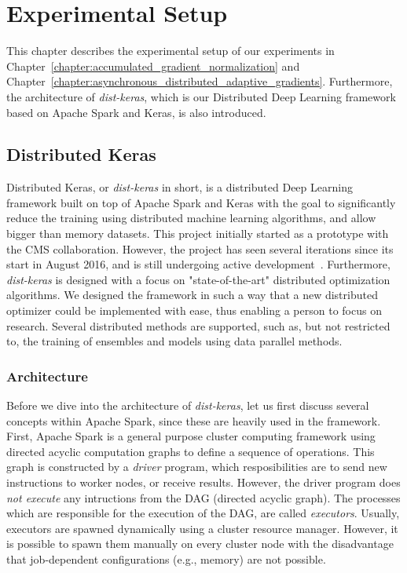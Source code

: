 %
%
%

\chapter{Experimental Setup}
\label{chapter:experiments}

This chapter describes the experimental setup of our experiments in Chapter~\ref{chapter:accumulated_gradient_normalization} and Chapter~\ref{chapter:asynchronous_distributed_adaptive_gradients}. Furthermore, the architecture of \emph{dist-keras}, which is our Distributed Deep Learning framework based on Apache Spark and Keras, is also introduced.

\section{Distributed Keras}
\label{sec:distributed_keras}

Distributed Keras, or \emph{dist-keras} in short, is a distributed Deep Learning framework built on top of Apache Spark and Keras with the goal to significantly reduce the training using distributed machine learning algorithms, and allow bigger than memory datasets. This project initially started as a prototype with the CMS collaboration. However, the project has seen several iterations since its start in August 2016, and is still undergoing active development~\cite{dist_keras}. Furthermore, \emph{dist-keras} is designed with a focus on "state-of-the-art" distributed optimization algorithms. We designed the framework in such a way that a new distributed optimizer could be implemented with ease, thus enabling a person to focus on research. Several distributed methods are supported, such as, but not restricted to, the training of ensembles and models using data parallel methods.

\subsection{Architecture}
\label{sec:dist_keras_architecture}

Before we dive into the architecture of \emph{dist-keras}, let us first discuss several concepts within Apache Spark, since these are heavily used in the framework. First, Apache Spark is a general purpose cluster computing framework using directed acyclic computation graphs to define a sequence of operations. This graph is constructed by a \emph{driver} program, which resposibilities are to send new instructions to worker nodes, or receive results. However, the driver program does \emph{not execute} any intructions from the DAG (directed acyclic graph). The processes which are responsible for the execution of the DAG, are called \emph{executors}. Usually, executors are spawned dynamically using a cluster resource manager. However, it is possible to spawn them manually on every cluster node with the disadvantage that job-dependent configurations (e.g., memory) are not possible.\\

